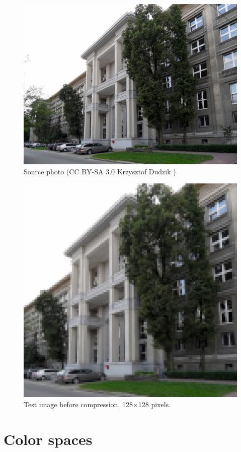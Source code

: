 \documentclass[10pt,aspectratio=169]{beamer}
\begin{document}
\begin{frame}[c,plain]
	\vspace{12pt}
	\begin{figure}
		\centering
		\includegraphics[height=0.5\textwidth]{images/mimuw.jpg}
		\caption{Source photo (CC BY-SA 3.0 Krzysztof Dudzik \cite{wiki:mimuw})}
	\end{figure}
\end{frame}

\begin{frame}[c,plain]
	\vspace{12pt}
	\begin{figure}
		\centering
		\includegraphics[height=0.5\textwidth]{images/mimuw-square-128-upscaled.png}
		\caption{Test image before compression, 128$\times$128 pixels.}
	\end{figure}
\end{frame}

\section{Color spaces}
\end{document}
